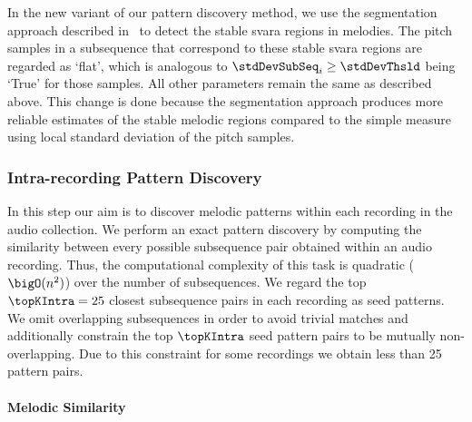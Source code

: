 In the new variant of our pattern discovery method, we use the segmentation approach described in~ to detect the stable \gls{svara} regions in melodies. The pitch samples in a subsequence that correspond to these stable \gls{svara} regions are regarded as `flat', which is analogous to $\stdDevSubSeq_i\geq \stdDevThsld$ being `True' for those samples. All other parameters remain the same as described above. This change is done because the segmentation approach produces more reliable estimates of the stable melodic regions compared to the simple measure using local standard deviation of the pitch samples. 


\subsubsection{Intra-recording Pattern Discovery}
\label{sec:intraRecordingPatternDiscovery}

In this step our aim is to discover melodic patterns within each recording in the audio collection. We perform an exact pattern discovery by computing the similarity between every possible subsequence pair obtained within an audio recording. Thus, the computational complexity of this task is quadratic ($\bigO(n^2)$) over the number of subsequences. We regard the top $\topKIntra=25$ closest subsequence pairs in each recording as seed patterns. We omit overlapping subsequences in order to avoid trivial matches and additionally constrain the top $\topKIntra$ seed pattern pairs to be mutually non-overlapping. Due to this constraint for some recordings we obtain less than 25 pattern pairs. 


\paragraph{Melodic Similarity} 

